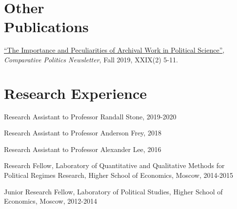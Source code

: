 \documentclass[margin,line,10.95pt]{res}
\begin{document}
\begin{resume}









\section{\sc Other \\ Publications}

\href{https://www.comparativepoliticsnewsletter.org/wp-content/uploads/2019/12/CP-Newsletter-Fall-19-CP-and-History.pdf}{``The Importance and Peculiarities of Archival Work in Political Science''}, \emph{Comparative Politics Newsletter}, Fall 2019, XXIX(2) 5-11.


\section{\sc Research Experience}

Research Assistant to Professor Randall Stone, 2019-2020 

\vspace*{-4.5mm}
Research Assistant to Professor Anderson Frey, 2018

\vspace*{-4.5mm}
Research Assistant to Professor Alexander Lee, 2016

\vspace*{-2.5mm}
Research Fellow, Laboratory of Quantitative and Qualitative Methods 
for Political Regimes Research, Higher School of Economics, Moscow, 2014-2015 

\vspace*{-4.5mm}
Junior Research Fellow, Laboratory of Political Studies, Higher School of Economics, Moscow, 2012-2014 


\end{resume}
\end{document}
